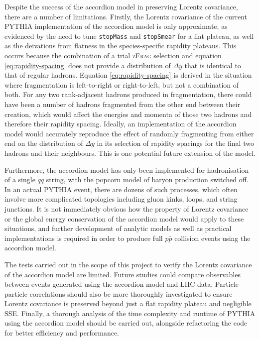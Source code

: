 \documentclass[12pt,a4paper]{report}
\begin{document}
Despite the success of the accordion model in preserving Lorentz covariance, there are a number of limitations. Firstly, the Lorentz covariance of the current PYTHIA implementation of the accordion model is only approximate, as evidenced by the need to tune \texttt{stopMass} and \texttt{stopSmear} for a flat plateau, as well as the deivations from flatness in the species-specific rapidity plateaus. This occurs because the combination of a trial \textsc{zFrag} selection and equation \eqref{eq:rapidity-spacing} does not provide a distribution of $\Delta y$ that is identical to that of regular hadrons. Equation \eqref{eq:rapidity-spacing} is derived in the situation where fragmentation is left-to-right or right-to-left, but not a combination of both. For any two rank-adjacent hadrons produced in fragmentation, there could have been a number of hadrons fragmented from the other end between their creation, which would affect the energies and momenta of those two hadrons and therefore their rapidity spacing. Ideally, an implementation of the accordion model would accurately reproduce the effect of randomly fragmenting from either end on the distribution of $\Delta y$ in its selection of rapidity spacings for the final two hadrons and their neighbours. This is one potential future extension of the model.

Furthermore, the accordion model has only been implemented for hadronisation of a single $q\bar{q}$ string, with the popcorn model of baryon production switched off. In an actual PYTHIA event, there are dozens of such processes, which often involve more complicated topologies including gluon kinks, loops, and string junctions. It is not immediately obvious how the property of Lorentz covariance or the global energy conservation of the accordion model would apply to these situations, and further development of analytic models as well as practical implementations is required in order to produce full $p\bar{p}$ collision events using the accordion model.

The tests carried out in the scope of this project to verify the Lorentz covariance of the accordion model are limited. Future studies could compare observables between events generated using the accordion model and LHC data. Particle-particle correlations should also be more thoroughly investigated to ensure Lorentz covariance is preserved beyond just a flat rapidity plateau and negligible SSE. Finally, a thorough analysis of the time complexity and runtime of PYTHIA using the accordion model should be carried out, alongside refactoring the code for better efficiency and performance.
\end{document}

